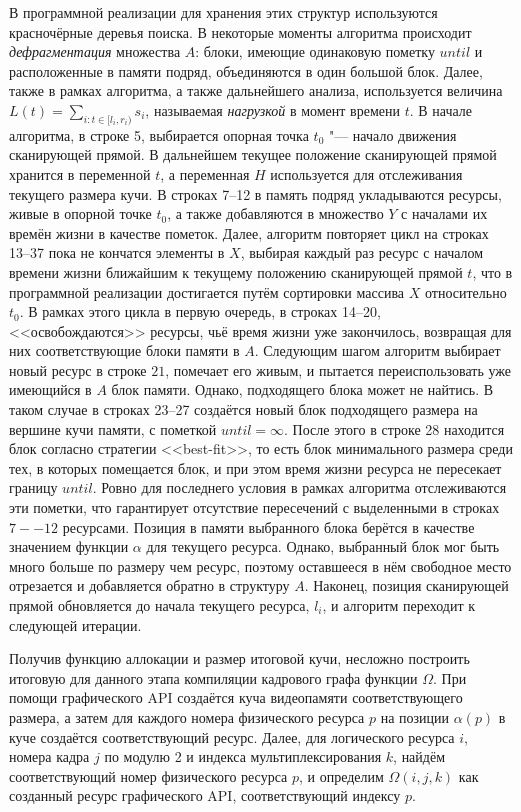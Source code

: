 В программной реализации для хранения этих структур используются красночёрные деревья поиска.
В некоторые моменты алгоритма происходит \textit{дефрагментация} множества $A$: блоки, имеющие одинаковую пометку $until$ и расположенные в памяти подряд, объединяются в один большой блок.
Далее, также в рамках алгоритма, а также дальнейшего анализа, используется величина $L(t) = \sum_{i: t \in [l_i, r_i)} s_i$, называемая \textit{нагрузкой} в момент времени $t$.
В начале алгоритма, в строке 5, выбирается опорная точка $t_0$ "--- начало движения сканирующей прямой.
В дальнейшем текущее положение сканирующей прямой хранится в переменной $t$, а переменная $H$ используется для отслеживания текущего размера кучи.
В строках 7--12 в память подряд укладываются ресурсы, живые в опорной точке $t_0$, а также добавляются в множество $Y$ с началами их времён жизни в качестве пометок.
Далее, алгоритм повторяет цикл на строках 13--37 пока не кончатся элементы в $X$, выбирая каждый раз ресурс с началом времени жизни ближайшим к текущему положению сканирующей прямой $t$, что в программной реализации достигается путём сортировки массива $X$ относительно $t_0$.
В рамках этого цикла в первую очередь, в строках 14--20, <<освобождаются>> ресурсы, чьё время жизни уже закончилось, возвращая для них соответствующие блоки памяти в $A$.
Следующим шагом алгоритм выбирает новый ресурс в строке $21$, помечает его живым, и пытается переиспользовать уже имеющийся в $A$ блок памяти.
Однако, подходящего блока может не найтись.
В таком случае в строках 23--27 создаётся новый блок подходящего размера на вершине кучи памяти, с пометкой $until = \infty$.
После этого в строке 28 находится блок согласно стратегии <<best-fit>>, то есть блок минимального размера среди тех, в которых помещается блок, и при этом время жизни ресурса не пересекает границу $until$.
Ровно для последнего условия в рамках алгоритма отслеживаются эти пометки, что гарантирует отсутствие пересечений с выделенными в строках $7--12$ ресурсами.
Позиция в памяти выбранного блока берётся в качестве значением функции $\alpha$ для текущего ресурса.
Однако, выбранный блок мог быть много больше по размеру чем ресурс, поэтому оставшееся в нём свободное место отрезается и добавляется обратно в структуру $A$.
Наконец, позиция сканирующей прямой обновляется до начала текущего ресурса, $l_i$, и алгоритм переходит к следующей итерации.

Получив функцию аллокации и размер итоговой кучи, несложно построить итоговую для данного этапа компиляции кадрового графа функции $\Omega$.
При помощи графического API создаётся куча видеопамяти соответствующего размера, а затем для каждого номера физического ресурса $p$ на позиции $\alpha(p)$ в куче создаётся соответствующий ресурс.
Далее, для логического ресурса $i$, номера кадра $j$ по модулю 2 и индекса мультиплексирования $k$, найдём соответствующий номер физического ресурса $p$, и определим $\Omega(i, j, k)$ как созданный ресурс графического API, соответствующий индексу $p$.

